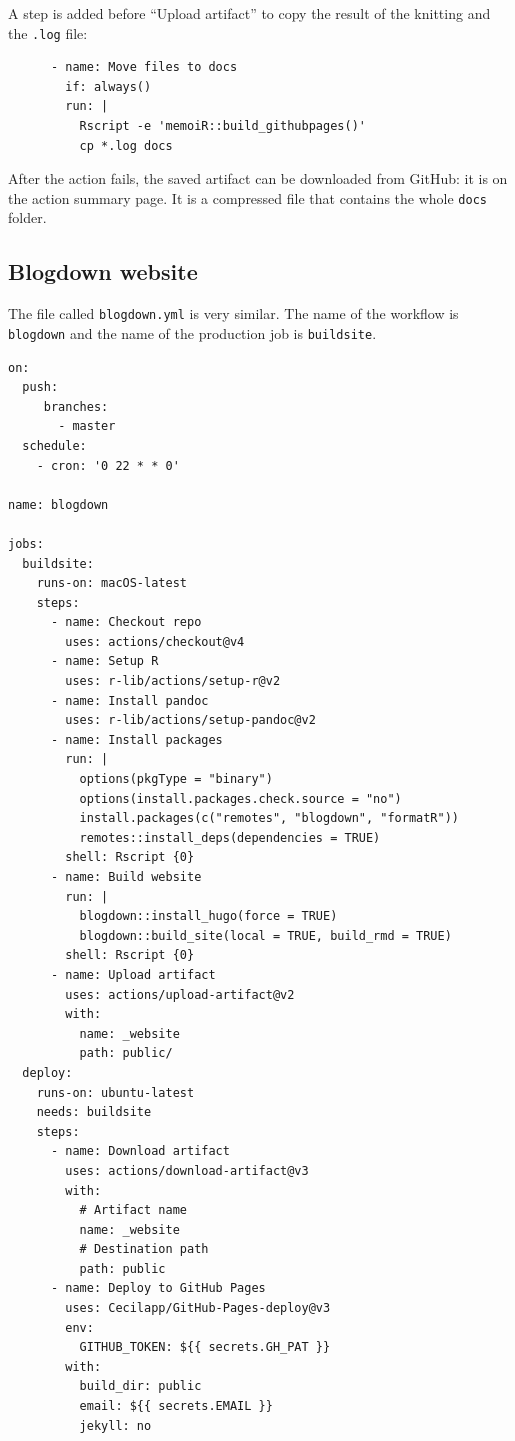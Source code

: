 \documentclass[
  12pt,
  american,
  a4paper,
  extrafontsizes,onecolumn,openright
  ]{memoir}
\begin{document}
A step is added before \enquote{Upload artifact} to copy the result of the knitting and the \texttt{.log} file:

\begin{verbatim}
      - name: Move files to docs
        if: always()
        run: |
          Rscript -e 'memoiR::build_githubpages()'
          cp *.log docs
\end{verbatim}

After the action fails, the saved artifact can be downloaded from GitHub: it is on the action summary page.
It is a compressed file that contains the whole \texttt{docs} folder.

\hypertarget{sec:blogdown-ci}{%
\subsection{Blogdown website}\label{sec:blogdown-ci}}

The file called \texttt{blogdown.yml} is very similar.
The name of the workflow is \texttt{blogdown} and the name of the production job is \texttt{buildsite}.

\begin{verbatim}
on:
  push:
     branches:
       - master
  schedule:
    - cron: '0 22 * * 0'

name: blogdown

jobs:
  buildsite:
    runs-on: macOS-latest
    steps:
      - name: Checkout repo
        uses: actions/checkout@v4
      - name: Setup R
        uses: r-lib/actions/setup-r@v2
      - name: Install pandoc
        uses: r-lib/actions/setup-pandoc@v2
      - name: Install packages
        run: |
          options(pkgType = "binary")
          options(install.packages.check.source = "no")
          install.packages(c("remotes", "blogdown", "formatR"))
          remotes::install_deps(dependencies = TRUE)
        shell: Rscript {0}
      - name: Build website
        run: |
          blogdown::install_hugo(force = TRUE)
          blogdown::build_site(local = TRUE, build_rmd = TRUE)
        shell: Rscript {0}
      - name: Upload artifact
        uses: actions/upload-artifact@v2
        with:
          name: _website
          path: public/
  deploy:
    runs-on: ubuntu-latest
    needs: buildsite
    steps:
      - name: Download artifact
        uses: actions/download-artifact@v3
        with:
          # Artifact name
          name: _website
          # Destination path
          path: public
      - name: Deploy to GitHub Pages
        uses: Cecilapp/GitHub-Pages-deploy@v3
        env:
          GITHUB_TOKEN: ${{ secrets.GH_PAT }}
        with:
          build_dir: public
          email: ${{ secrets.EMAIL }}
          jekyll: no
\end{verbatim}
\end{document}
